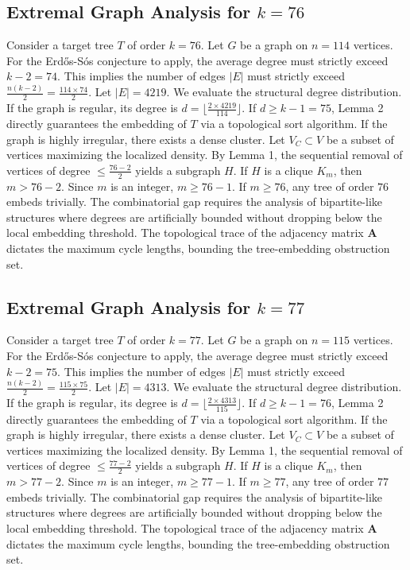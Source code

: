 \documentclass[11pt,a4paper]{article}
\begin{document}
\subsection{Extremal Graph Analysis for $k=76$}
Consider a target tree $T$ of order $k=76$.
Let $G$ be a graph on $n=114$ vertices.
For the Erd\H{o}s-S\'os conjecture to apply, the average degree must strictly exceed $k-2 = 74$.
This implies the number of edges $|E|$ must strictly exceed $\frac{n(k-2)}{2} = \frac{114 \times 74}{2}$.
Let $|E| = 4219$.
We evaluate the structural degree distribution. If the graph is regular, its degree is $d = \lfloor \frac{2 \times 4219}{114} \rfloor$.
If $d \geq k-1 = 75$, Lemma 2 directly guarantees the embedding of $T$ via a topological sort algorithm.
If the graph is highly irregular, there exists a dense cluster. Let $V_C \subset V$ be a subset of vertices maximizing the localized density.
By Lemma 1, the sequential removal of vertices of degree $\leq \frac{76-2}{2}$ yields a subgraph $H$.
If $H$ is a clique $K_{m}$, then $m > 76-2$. Since $m$ is an integer, $m \geq 76-1$. If $m \geq 76$, any tree of order $76$ embeds trivially.
The combinatorial gap requires the analysis of bipartite-like structures where degrees are artificially bounded without dropping below the local embedding threshold. The topological trace of the adjacency matrix $\mathbf{A}$ dictates the maximum cycle lengths, bounding the tree-embedding obstruction set.


\subsection{Extremal Graph Analysis for $k=77$}
Consider a target tree $T$ of order $k=77$.
Let $G$ be a graph on $n=115$ vertices.
For the Erd\H{o}s-S\'os conjecture to apply, the average degree must strictly exceed $k-2 = 75$.
This implies the number of edges $|E|$ must strictly exceed $\frac{n(k-2)}{2} = \frac{115 \times 75}{2}$.
Let $|E| = 4313$.
We evaluate the structural degree distribution. If the graph is regular, its degree is $d = \lfloor \frac{2 \times 4313}{115} \rfloor$.
If $d \geq k-1 = 76$, Lemma 2 directly guarantees the embedding of $T$ via a topological sort algorithm.
If the graph is highly irregular, there exists a dense cluster. Let $V_C \subset V$ be a subset of vertices maximizing the localized density.
By Lemma 1, the sequential removal of vertices of degree $\leq \frac{77-2}{2}$ yields a subgraph $H$.
If $H$ is a clique $K_{m}$, then $m > 77-2$. Since $m$ is an integer, $m \geq 77-1$. If $m \geq 77$, any tree of order $77$ embeds trivially.
The combinatorial gap requires the analysis of bipartite-like structures where degrees are artificially bounded without dropping below the local embedding threshold. The topological trace of the adjacency matrix $\mathbf{A}$ dictates the maximum cycle lengths, bounding the tree-embedding obstruction set.
\end{document}
